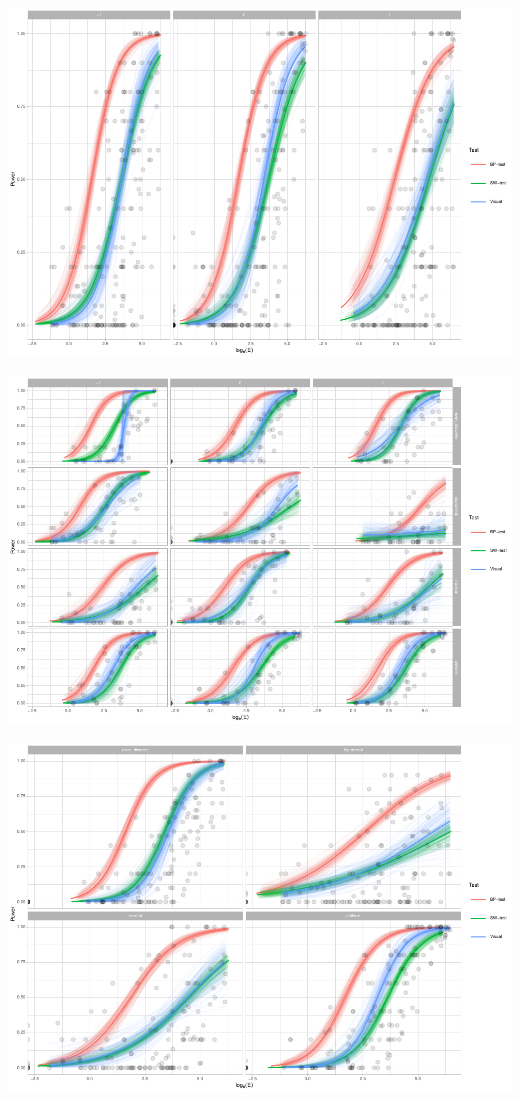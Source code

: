 \documentclass[]{interact}
\theoremstyle{plain}%
\theoremstyle{definition}
\theoremstyle{remark}
\begin{document}
\includegraphics{paper_comparison_files/figure-latex/unnamed-chunk-17-1.pdf}

\includegraphics{paper_comparison_files/figure-latex/unnamed-chunk-18-1.pdf}

\includegraphics{paper_comparison_files/figure-latex/unnamed-chunk-19-1.pdf}
\end{document}
